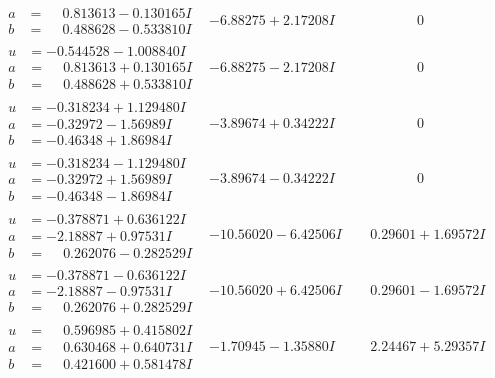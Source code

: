\documentclass[1p]{elsarticle_modified}
\theoremstyle{definition}
\begin{document}
$$\begin{array}{c|c|c}
\begin{aligned}
a &= \phantom{-}0.813613 - 0.130165 I \\
b &= \phantom{-}0.488628 - 0.533810 I\end{aligned}
 & -6.88275 + 2.17208 I & \phantom{-0.000000 } 0 \\ \hline\begin{aligned}
u &= -0.544528 - 1.008840 I \\
a &= \phantom{-}0.813613 + 0.130165 I \\
b &= \phantom{-}0.488628 + 0.533810 I\end{aligned}
 & -6.88275 - 2.17208 I & \phantom{-0.000000 } 0 \\ \hline\begin{aligned}
u &= -0.318234 + 1.129480 I \\
a &= -0.32972 - 1.56989 I \\
b &= -0.46348 + 1.86984 I\end{aligned}
 & -3.89674 + 0.34222 I & \phantom{-0.000000 } 0 \\ \hline\begin{aligned}
u &= -0.318234 - 1.129480 I \\
a &= -0.32972 + 1.56989 I \\
b &= -0.46348 - 1.86984 I\end{aligned}
 & -3.89674 - 0.34222 I & \phantom{-0.000000 } 0 \\ \hline\begin{aligned}
u &= -0.378871 + 0.636122 I \\
a &= -2.18887 + 0.97531 I \\
b &= \phantom{-}0.262076 - 0.282529 I\end{aligned}
 & -10.56020 - 6.42506 I & \phantom{-}0.29601 + 1.69572 I \\ \hline\begin{aligned}
u &= -0.378871 - 0.636122 I \\
a &= -2.18887 - 0.97531 I \\
b &= \phantom{-}0.262076 + 0.282529 I\end{aligned}
 & -10.56020 + 6.42506 I & \phantom{-}0.29601 - 1.69572 I \\ \hline\begin{aligned}
u &= \phantom{-}0.596985 + 0.415802 I \\
a &= \phantom{-}0.630468 + 0.640731 I \\
b &= \phantom{-}0.421600 + 0.581478 I\end{aligned}
 & -1.70945 - 1.35880 I & \phantom{-}2.24467 + 5.29357 I \\ \hline\begin{aligned}

\end{aligned}
\end{array}$$
\end{document}
